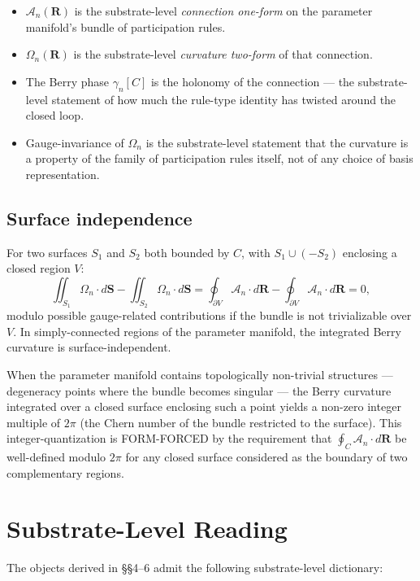 \documentclass[11pt,a4paper]{article}
\begin{document}
\begin{itemize}[noitemsep]
  \item $\mathcal{A}_n(\mathbf{R})$ is the substrate-level \emph{connection one-form} on the parameter manifold's bundle of participation rules.
  \item $\Omega_n(\mathbf{R})$ is the substrate-level \emph{curvature two-form} of that connection.
  \item The Berry phase $\gamma_n[C]$ is the holonomy of the connection --- the substrate-level statement of how much the rule-type identity has twisted around the closed loop.
  \item Gauge-invariance of $\Omega_n$ is the substrate-level statement that the curvature is a property of the family of participation rules itself, not of any choice of basis representation.
\end{itemize}

\subsection{Surface independence}

For two surfaces $S_1$ and $S_2$ both bounded by $C$, with $S_1 \cup (-S_2)$ enclosing a closed region $V$:
\[
\iint_{S_1} \Omega_n \cdot d\mathbf{S} - \iint_{S_2} \Omega_n \cdot d\mathbf{S} = \oint_{\partial V} \mathcal{A}_n \cdot d\mathbf{R} - \oint_{\partial V} \mathcal{A}_n \cdot d\mathbf{R} = 0,
\]
modulo possible gauge-related contributions if the bundle is not trivializable over $V$. In simply-connected regions of the parameter manifold, the integrated Berry curvature is surface-independent.

When the parameter manifold contains topologically non-trivial structures --- degeneracy points where the bundle becomes singular --- the Berry curvature integrated over a closed surface enclosing such a point yields a non-zero integer multiple of $2\pi$ (the Chern number of the bundle restricted to the surface). This integer-quantization is FORM-FORCED by the requirement that $\oint_C \mathcal{A}_n\cdot d\mathbf{R}$ be well-defined modulo $2\pi$ for any closed surface considered as the boundary of two complementary regions.

\section{Substrate-Level Reading}

The objects derived in \S\S4--6 admit the following substrate-level dictionary:
\end{document}

